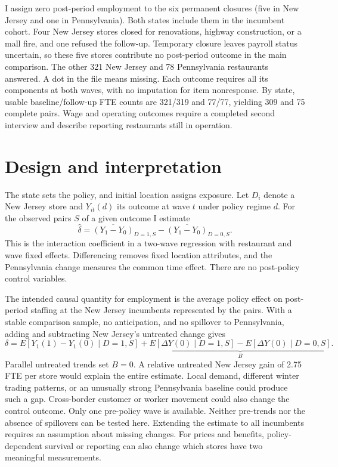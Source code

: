 \documentclass[11pt]{article}
\begin{document}
I assign zero post-period employment to the six permanent closures
(five in New Jersey and one in Pennsylvania). Both states include them
in the incumbent cohort. Four New Jersey stores closed for renovations,
highway construction, or a mall fire, and one refused the follow-up.
Temporary closure leaves payroll status uncertain, so these five stores
contribute no post-period outcome in the main comparison. The other
321 New Jersey and 78 Pennsylvania restaurants answered. A dot in the
file means missing. Each outcome requires all its components at both
waves, with no imputation for item nonresponse. By state, usable
baseline/follow-up FTE counts are 321/319 and 77/77, yielding 309
and 75 complete pairs. Wage and operating outcomes require a completed
second interview and describe reporting restaurants still in operation.

\section{Design and interpretation}
The state sets the policy, and initial location assigns exposure.
Let $D_i$ denote a New Jersey store and $Y_{it}(d)$ its outcome at
wave $t$ under policy regime $d$. For the observed pairs $S$ of a
given outcome I estimate
\[
 \widehat\delta=\overline{(Y_1-Y_0)}_{D=1,S}
               -\overline{(Y_1-Y_0)}_{D=0,S}.
\]
This is the interaction coefficient in a two-wave regression with
restaurant and wave fixed effects. Differencing removes fixed
location attributes, and the Pennsylvania change measures the common
time effect. There are no post-policy control variables.

The intended causal quantity for employment is the average policy effect
on post-period staffing at the New Jersey incumbents represented by the
pairs. With a stable comparison sample, no anticipation, and no spillover
to Pennsylvania, adding and subtracting New Jersey's untreated change gives
\[
 \delta=E[Y_1(1)-Y_1(0)\mid D=1,S]+
 \underbrace{E[\Delta Y(0)\mid D=1,S]-
 E[\Delta Y(0)\mid D=0,S]}_{B}.
\]
Parallel untreated trends set $B=0$. A relative untreated New Jersey gain
of 2.75 FTE per store would explain the entire estimate. Local demand,
different winter trading patterns, or an unusually strong Pennsylvania
baseline could produce such a gap. Cross-border customer or worker
movement could also change the control outcome. Only one pre-policy
wave is available. Neither pre-trends nor the absence of spillovers
can be tested here. Extending the estimate to all incumbents requires
an assumption about missing changes. For prices and benefits,
policy-dependent survival or reporting can also change which stores have
two meaningful measurements.
\end{document}
